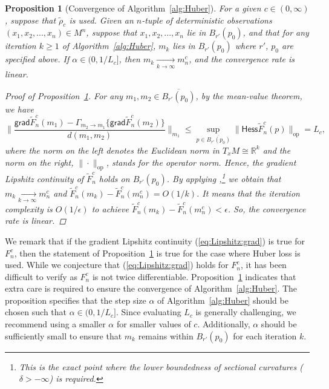 \documentclass[preprint]{imsart}
\theoremstyle{plain}
\newtheorem{proposition}{Proposition}
\theoremstyle{remark}
\begin{document}
\begin{appendix}
\begin{proposition}[Convergence of Algorithm~\ref{alg:Huber}]\label{prop:alg:conv}
For a given $c \in (0,\infty)$, suppose that $\tilde{\rho}_{c}$ is used. Given an $n$-tuple of deterministic observations $(x_{1}, x_{2}, ..., x_{n}) \in M^{n}$, suppose that $x_{1}, x_{2}, ..., x_{n}$ lie in $B_{r'}(p_0)$, and that for any iteration $k \ge 1$ of Algorithm~\ref{alg:Huber}, $m_{k}$ lies in $B_{r'}(p_0)$ where $r'$, $p_0$ are specified above. If $\alpha \in (0, 1/L_{c}]$, then $m_{k} \underset{k\rightarrow \infty}{\rightarrow} m^{c}_{n}$, and the convergence rate is linear.


\begin{proof}[Proof of Proposition~\ref{prop:alg:conv}]
For any $m_{1}, m_{2} \in \overline{B_{r'}(p_0)}$, by the mean-value theorem, we have
\[
\|\frac{\textsf{grad}\tilde{F}_{n}^{c}(m_{1}) - \Gamma_{m_{2} \to m_{1}}\{\textsf{grad} \tilde{F}_{n}^{c}(m_{2})\}}{d(m_{1}, m_{2})}\|_{m_1} \le \sup_{p \in \overline{B_{r'}(p_0)}} \|\textsf{Hess}\tilde{F}_{n}^{c}(p)\|_{\textrm{op}} = L_{c},  
\]
where the norm on the left denotes the Euclidean norm in $T_{x}M \cong \mathbb{R}^{k}$ and the norm on the right, $\|\cdot\|_{\textrm{op}}$, stands for the operator norm. Hence, the gradient Lipshitz continuity of $\tilde{F}_{n}^{c}$ holds on $B_{r'}(p_0)$. By applying \citep[Theorem 3,][]{ferreira2019gradient},\footnote{This is the exact point where the lower boundedness of sectional curvatures ($\delta > -\infty$) is required.} we obtain that $m_{k} \underset{k \rightarrow \infty}{\rightarrow} m^{c}_{n}$ and $\tilde{F}_{n}^{c}(m_{k}) - \tilde{F}_{n}^{c}(m^{c}_{n}) = O(1/k)$. It means that the iteration complexity is $O(1/\epsilon)$ to achieve $\tilde{F}_{n}^{c}(m_{k}) - \tilde{F}_{n}^{c}(m^{c}_{n}) < \epsilon$. So, the convergence rate is linear.
\end{proof} 
\end{proposition}


We remark that if the gradient Lipshitz continuity (\ref{eq:Lipshitz:grad}) is true for $F_n^c$, then the statement of Proposition~\ref{prop:alg:conv} is true for the case where Huber loss is used. While we conjecture that (\ref{eq:Lipshitz:grad}) holds for $F_n^c$, it has been difficult to verify as $F_n^c$ is not twice differentiable. Proposition~\ref{prop:alg:conv} indicates that extra care is required to ensure the convergence of Algorithm~\ref{alg:Huber}. The proposition specifies that the step size $\alpha$ of Algorithm~\ref{alg:Huber} should be chosen such that $\alpha \in (0, 1/L_{c}]$. Since evaluating $L_{c}$ is generally challenging, we recommend using a smaller $\alpha$ for smaller values of $c$. Additionally, $\alpha$ should be sufficiently small to ensure that $m_{k}$ remains within $B_{r'}(p_0)$ for each iteration $k$.



\end{appendix}
\end{document}
